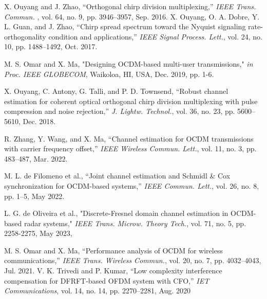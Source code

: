 \documentclass[journal]{IEEEtran}
\begin{document}

\newpage

\begin{thebibliography}{1}
X. Ouyang and J. Zhao, “Orthogonal chirp division multiplexing,” \textit{IEEE Trans. Commun.} , vol. 64, no. 9, pp. 3946–3957, Sep. 2016.
X. Ouyang, O. A. Dobre, Y. L. Guan, and J. Zhao, “Chirp spread spectrum toward the Nyquist
signaling rate-orthogonality condition and applications,” \textit{IEEE Signal Process. Lett.}, vol. 24, no. 10, pp. 1488–1492, Oct. 2017.

M. S. Omar and X. Ma, "Designing OCDM-based multi-user transmissions," \textit{in Proc. IEEE GLOBECOM}, Waikoloa,
HI, USA, Dec. 2019, pp. 1-6.

X. Ouyang, C. Antony, G. Talli, and P. D. Townsend, “Robust channel estimation for coherent optical orthogonal chirp division multiplexing with pulse compression and noise rejection,” \textit{J. Lightw. Technol.}, vol.
36, no. 23, pp. 5600–5610, Dec. 2018.

 R. Zhang, Y. Wang, and X. Ma, “Channel estimation for OCDM
transmissions with carrier frequency offset,” \textit{IEEE Wireless Commun.
Lett.}, vol. 11, no. 3, pp. 483–487, Mar. 2022.

 M. L. de Filomeno et al., “Joint channel estimation and Schmidl \&
Cox synchronization for OCDM-based systems,” \textit{IEEE Commun. Lett.},
vol. 26, no. 8, pp. 1–5, May 2022.

L. G. de Oliveira et al., "Discrete-Fresnel domain channel estimation in OCDM-based radar systems," \textit{IEEE Trans. Microw. Theory Tech.}, vol. 71, no. 5, pp. 2258-2275, May 2023,
  

 M. S. Omar and X. Ma, “Performance analysis of OCDM for wireless communications,” \textit{IEEE
Trans. Wireless Commun.}, vol. 20, no. 7, pp. 4032–4043, Jul. 2021.
V. K. Trivedi and P. Kumar, “Low complexity interference compensation for DFRFT-based OFDM system with CFO,” \textit{IET Communications}, vol. 14, no. 14, pp. 2270–2281,
Aug. 2020


\end{thebibliography}
\end{document}
